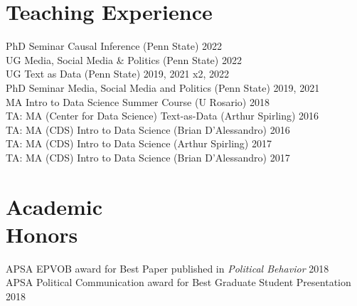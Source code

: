 \documentclass[margin]{res}
\begin{document}
{\section{Teaching Experience}

PhD Seminar Causal Inference (Penn State) \hfill 2022\\
UG Media, Social Media \& Politics (Penn State) \hfill 2022\\
UG Text as Data (Penn State) \hfill 2019, 2021 x2, 2022\\
PhD Seminar Media, Social Media and Politics (Penn State) \hfill 2019, 2021\\
MA Intro to Data Science Summer Course (U Rosario) \hfill 2018\\
TA: MA (Center for Data Science) Text-as-Data (Arthur Spirling) \hfill  2016\\
TA: MA (CDS) Intro to Data Science (Brian D'Alessandro) \hfill  2016\\
TA: MA (CDS) Intro to Data Science (Arthur Spirling) \hfill  2017\\
TA: MA (CDS) Intro to Data Science (Brian D'Alessandro) \hfill  2017\\



\section{Academic \\ Honors} 

APSA EPVOB award for Best Paper published in \textit{Political Behavior} \hfill 2018\\
APSA Political Communication award for Best Graduate Student Presentation \hfill 2018



}
\end{document}
